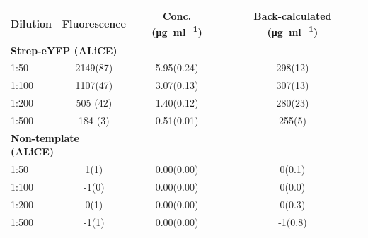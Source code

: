 \begin{supptable}[ht]
    \centering
    \caption{\textbf{Measured fluorescence and estimated Strep-eYFP concentrations for Strep-eYFP (ALiCE\textsuperscript{\textregistered}) and Non-template (ALiCE\textsuperscript{\textregistered}). } The concentration was calculated from the fluorescence using the linear model shown in \autoref{fig:calibration_eyfp}. Back-calculation of the original sample concentration was done by multiplication with the dilution factor. }
    \label{tab:sample_values_eyfp}
    \begin{tabular}{
        l
        S[table-format=4.0(2),uncertainty-mode = separate]
        S[table-format=1.2(2),uncertainty-mode = separate]
        S[table-format=3.1(2),uncertainty-mode = separate]
    }
    \toprule
    {\textbf{Dilution}} &
    {\textbf{Fluorescence}} &
    {\textbf{Conc. (\si{\micro\gram\per\milli\litre})}} &
    {\textbf{Back-calculated (\si{\micro\gram\per\milli\litre})}} \\
    \midrule
     \\
    1:50   & 2149(87)   & 5.95(0.24) & 298(12) \\
    1:100  & 1107(47)   & 3.07(0.13) & 307(13) \\
    1:200  & 505 (42)    & 1.40(0.12) & 280(23) \\
    1:500  & 184 (3)    & 0.51(0.01) & 255(5) \\
    \midrule
     \\
    1:50   & 1(1)       & 0.00(0.00) & 0(0.1) \\
    1:100  & -1(0)      & 0.00(0.00) & 0(0.0) \\
    1:200  & 0(1)      & 0.00(0.00) & 0(0.3) \\
    1:500  & -1(1)      & 0.00(0.00) & -1(0.8) \\
    \bottomrule
    \end{tabular}
\end{supptable}

